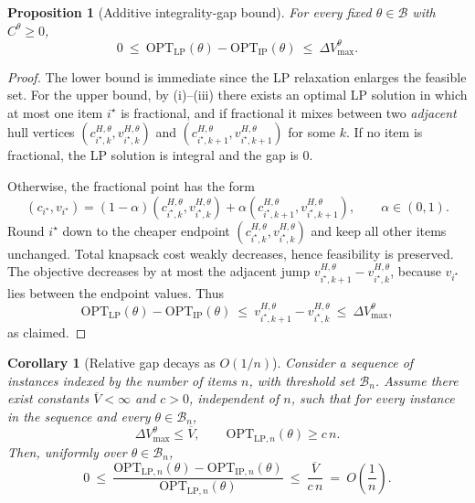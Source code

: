 \documentclass[11pt, a4paper]{article}
\theoremstyle{plain}
\newtheorem{proposition}[proposition]{Proposition}
\newtheorem{corollary}[corollary]{Corollary}
\theoremstyle{definition}
\theoremstyle{remark}
\begin{document}
\begin{proposition}[Additive integrality-gap bound]\label{prop:igap_additive_theta_clean}
For every fixed $\theta\in\mathcal B$ with $C^\theta\ge 0$,
\[
0\ \le\ \mathrm{OPT}_{\mathrm{LP}}(\theta)-\mathrm{OPT}_{\mathrm{IP}}(\theta)\ \le\ \Delta V_{\max}^\theta .
\]
\end{proposition}

\begin{proof}
The lower bound is immediate since the LP relaxation enlarges the feasible set. For the upper bound, by
(i)--(iii) there exists an optimal LP solution in which at most one item $i^\star$ is fractional, and if fractional
it mixes between two \emph{adjacent} hull vertices $(c^{H,\theta}_{i^\star,k},v^{H,\theta}_{i^\star,k})$ and
$(c^{H,\theta}_{i^\star,k+1},v^{H,\theta}_{i^\star,k+1})$ for some $k$. If no item is fractional, the LP solution is integral and the gap
is $0$.

Otherwise, the fractional point has the form
\[
(c_{i^\star},v_{i^\star})
=(1-\alpha)(c^{H,\theta}_{i^\star,k},v^{H,\theta}_{i^\star,k})+\alpha(c^{H,\theta}_{i^\star,k+1},v^{H,\theta}_{i^\star,k+1}),
\qquad \alpha\in(0,1).
\]
Round $i^\star$ down to the cheaper endpoint $(c^{H,\theta}_{i^\star,k},v^{H,\theta}_{i^\star,k})$ and keep all other items unchanged.
Total knapsack cost weakly decreases, hence feasibility is preserved. The objective decreases by at most the adjacent jump
$v^{H,\theta}_{i^\star,k+1}-v^{H,\theta}_{i^\star,k}$, because $v_{i^\star}$ lies between the endpoint values. Thus
\[
\mathrm{OPT}_{\mathrm{LP}}(\theta)-\mathrm{OPT}_{\mathrm{IP}}(\theta)
\ \le\ v^{H,\theta}_{i^\star,k+1}-v^{H,\theta}_{i^\star,k}
\ \le\ \Delta V_{\max}^\theta,
\]
as claimed.
\end{proof}

\begin{corollary}[Relative gap decays as \(O(1/n)\)]\label{cor:igap_relative_theta_clean}
Consider a sequence of instances indexed by the number of items $n$, with threshold set $\mathcal B_n$. Assume there exist constants $\overline V<\infty$ and $c>0$, independent of $n$, such that for every instance in the sequence and every $\theta\in\mathcal B_n$,
\[
\Delta V_{\max}^\theta\le \overline V,
\qquad
\mathrm{OPT}_{\mathrm{LP},n}(\theta)\ge c\,n.
\]
Then, uniformly over $\theta\in\mathcal B_n$,
\[
0\ \le\
\frac{\mathrm{OPT}_{\mathrm{LP},n}(\theta)-\mathrm{OPT}_{\mathrm{IP},n}(\theta)}{\mathrm{OPT}_{\mathrm{LP},n}(\theta)}
\ \le\
\frac{\overline V}{c\,n}
\ =\ O\!\left(\frac{1}{n}\right).
\]
\end{corollary}
\end{document}
